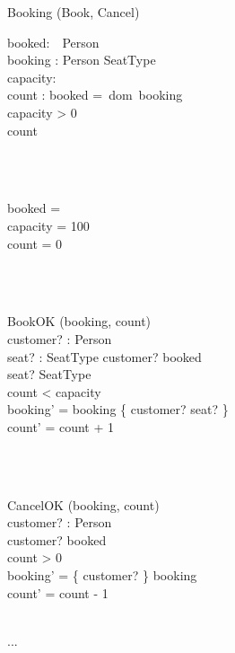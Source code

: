 \documentclass[12pt]{article}
\begin{document}
\begin{class}{Booking}
\also
\upharpoonright (Book, Cancel) \\
\begin{state}
booked:~~Person\\
booking : Person \pinj SeatType\\
capacity: \\
count : 
\where
booked =~dom~booking\\
capacity > 0\\
count 
\end{state} \\
\ \\
\begin{init}
booked = \emptyset \\
capacity = 100\\
count = 0
\end{init} \\
\ \\
\begin{op}{BookOK}
\Delta (booking, count) \\
customer? : Person\\
seat? : SeatType
\ST
customer? \notin booked\\
seat? \notin \ran SeatType\\
count < capacity\\
booking' = booking \cup \{ customer? \mapsto seat? \}\\
count' = count + 1
\end{op}\\
\ \\
\begin{op}{CancelOK}
\Delta (booking, count) \\
customer? : Person\\
\ST
customer? \in booked\\
count > 0\\
booking' = \{ customer? \} \ndres booking\\
count' = count - 1
\end{op}\\
...\\
\end{class}

\newpage
\end{document}
